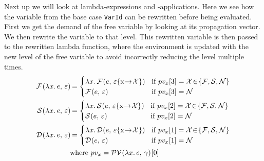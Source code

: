 \documentclass[../main.tex]{subfiles}
\begin{document}
%
Next up we will look at lambda-expressions and -applications. Here we see how the variable from the base case \texttt{VarId} can be rewritten before being evaluated. First we get the demand of the free variable by looking at its propagation vector. We then rewrite the variable to that level. This rewritten variable is then passed to the rewritten lambda function, where the environment is updated with the new level of the free variable to avoid incorrectly reducing the level multiple times.
\begin{align*}
    \reduce{F}{\lambdaexpr{x}{e}} &= \begin{cases}
            \lambdaexpr{x}{\reduce[\envmap{\varepsilon}{x}{\X}]{F}{e}}
                &\text{if } pv_x[3] = \X\hspace{-2pt} \in\hspace{-2pt} \{ \F,\S,\N \} \\
            \reduce{F}{e}
                &\text{if } pv_x[3] = \N
        \end{cases} \\
    \reduce{S}{\lambdaexpr{x}{e}} &= \begin{cases}
            \lambdaexpr{x}{\reduce[\envmap{\varepsilon}{x}{\X}]{S}{e}}
                &\text{if } pv_x[2] = \X\hspace{-2pt} \in\hspace{-2pt} \{ \F,\S,\N \} \\
            \reduce{S}{e}
                &\text{if } pv_x[2] = \N
        \end{cases} \\
    \reduce{D}{\lambdaexpr{x}{e}} &= \begin{cases}
            \lambdaexpr{x}{\reduce[\envmap{\varepsilon}{x}{\X}]{D}{e}}
                &\text{if } pv_x[1] = \X\hspace{-2pt} \in\hspace{-2pt} \{ \F,\S,\N \} \\
            \reduce{D}{e}
                &\text{if } pv_x[1] = \N
        \end{cases} \\
        &\text{where } pv_x = \pv{\lambdaexpr{x}{e}}[0]
\end{align*}
%
\end{document}
